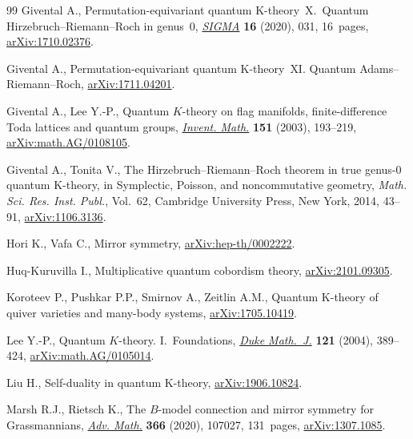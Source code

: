 \documentclass[10pt,a4paper]{amsart}
\numberwithin{equation}{section}
\theoremstyle{definition}
\theoremstyle{plain}
\begin{document}
\begin{thebibliography}{99}
Givental A., Permutation-equivariant quantum {K}-theory~{X}.~{Q}uantum
 {H}irzebruch--{R}iemann--{R}och in genus~0, \href{https://doi.org/10.3842/SIGMA.2020.031}{\textit{SIGMA}} \textbf{16}
 (2020), 031, 16~pages, \href{https://arxiv.org/abs/1710.02376}{arXiv:1710.02376}.

Givental A., Permutation-equivariant quantum {K}-theory~{XI}. Quantum
 {A}dams--{R}iemann--{R}och, \href{https://arxiv.org/abs/1711.04201}{arXiv:1711.04201}.


Givental A., Lee Y.-P., Quantum {$K$}-theory on flag manifolds,
 finite-difference {T}oda lattices and quantum groups, \href{https://doi.org/10.1007/s00222-002-0250-y}{\textit{Invent. Math.}}
 \textbf{151} (2003), 193--219, \href{https://arxiv.org/abs/math.AG/0108105}{arXiv:math.AG/0108105}.

Givental A., Tonita V., The {H}irzebruch--{R}iemann--{R}och theorem in true
 genus-0 quantum {K}-theory, in Symplectic, {P}oisson, and noncommutative
 geometry, \textit{Math. Sci. Res. Inst. Publ.}, Vol.~62, Cambridge University
 Press, New York, 2014, 43--91, \href{https://arxiv.org/abs/1106.3136}{arXiv:1106.3136}.

Hori K., Vafa C., Mirror symmetry, \href{https://arxiv.org/abs/hep-th/0002222}{arXiv:hep-th/0002222}.

Huq-Kuruvilla I., Multiplicative quantum cobordism theory, \href{https://arxiv.org/abs/2101.09305}{arXiv:2101.09305}.

Koroteev P., Pushkar P.P., Smirnov A., Zeitlin A.M., Quantum {K}-theory of
 quiver varieties and many-body systems, \href{https://arxiv.org/abs/1705.10419}{arXiv:1705.10419}.

Lee Y.-P., Quantum {$K$}-theory. {I}.~{F}oundations, \href{https://doi.org/10.1215/S0012-7094-04-12131-1}{\textit{Duke Math.~J.}}
 \textbf{121} (2004), 389--424, \href{https://arxiv.org/abs/math.AG/0105014}{arXiv:math.AG/0105014}.

Liu H., Self-duality in quantum {K}-theory, \href{https://arxiv.org/abs/1906.10824}{arXiv:1906.10824}.

Marsh R.J., Rietsch K., The {$B$}-model connection and mirror symmetry for
 {G}rassmannians, \href{https://doi.org/10.1016/j.aim.2020.107027}{\textit{Adv. Math.}} \textbf{366} (2020), 107027, 131~pages,
 \href{https://arxiv.org/abs/1307.1085}{arXiv:1307.1085}.


\end{thebibliography}
\end{document}
